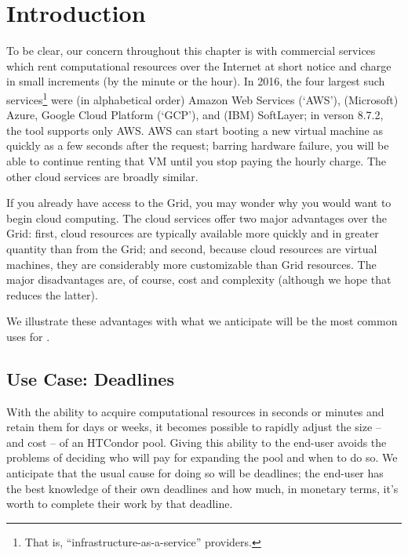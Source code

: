 \section{\label{sec:clouds-introduction}Introduction}

To be clear, our concern throughout this chapter is with commercial services
which rent computational resources over the Internet at short notice and
charge in small increments (by the minute or the hour).  In 2016, the four
largest such services\footnote{That is, ``infrastructure-as-a-service''
providers.} were (in alphabetical order) Amazon Web Services (`AWS'),
(Microsoft) Azure, Google Cloud Platform (`GCP'), and (IBM) SoftLayer; in
verson 8.7.2, the  tool supports only AWS.  AWS can start
booting a new virtual machine as quickly as a few seconds after the request;
barring hardware failure, you will be able to continue renting that VM until
you stop paying the hourly charge.  The other cloud services are broadly
similar.

If you already have access to the Grid, you may wonder why you would want to
begin cloud computing.  The cloud services offer two major advantages over
the Grid: first, cloud resources are typically available more quickly and
in greater quantity than from the Grid; and second, because cloud resources are
virtual machines, they are considerably more customizable than Grid resources.
The major disadvantages are, of course, cost and complexity (although we
hope that  reduces the latter).

We illustrate these advantages with what we anticipate will be the most
common uses for .

\subsection{Use Case: Deadlines}

With the ability to acquire computational resources in seconds or minutes
and retain them for days or weeks, it becomes possible to rapidly adjust
the size -- and cost -- of an HTCondor pool.  Giving this ability to the
end-user avoids the problems of deciding who will pay for expanding the
pool and when to do so.  We anticipate that the usual cause for doing so
will be deadlines; the end-user has the best knowledge of their own
deadlines and how much, in monetary terms, it's worth to complete their
work by that deadline.


